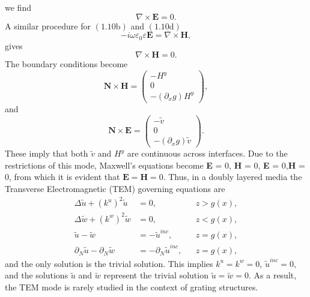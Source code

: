 we find
$$\nabla \times \textbf{E}=0.$$
A similar procedure for $(1.10\text{b})$ and $(1.10\text{d})$
$$-i\omega\varepsilon_0\varepsilon \textbf{E} = \nabla \times \textbf{H},$$
gives
$$\nabla \times \textbf{H}=0.$$
The boundary conditions become
\begin{equation}
\textbf{N} \times \textbf{H} = \begin{pmatrix}
-H^y \\ 0 \\ -(\partial_x g)H^y
\end{pmatrix},
\end{equation}
and
\begin{equation}
\textbf{N} \times \textbf{E} = \begin{pmatrix}
-\tilde{v} \\ 0 \\ -(\partial_x g)\tilde{v}
\end{pmatrix}.
\end{equation}
These imply that both $\tilde{v}$ and $H^y$ are continuous across interfaces. Due to the restrictions of this mode, Maxwell's equations become
\be
\nabla \times \textbf{E} = 0, \quad \nabla \times \textbf{H} = 0, \quad \nabla \cdot \textbf{E} = 0,\quad  \nabla \cdot \textbf{H} = 0,
\ee
from which it is evident that $\textbf{E}=\textbf{H}=0$. Thus, in a doubly layered media the Transverse Electromagnetic (TEM) governing equations are
\begin{subequations}
\begin{align}
\Delta \tilde{u} + (k^u)^2 \tilde{u} &=0,&& z > g(x),\\
\Delta \tilde{w} + (k^w)^2 \tilde{w} &=0,&& z < g(x),\\
\tilde{u}-\tilde{w} &= -\tilde{u}^{inc},&& z=g(x),\\
\partial_N \tilde{u}-\partial_N \tilde{w} &= -\partial_N \tilde{u}^{inc},&& z=g(x),
\end{align}
\end{subequations}
and the only solution is the trivial solution. This implies $k^u=k^w=0$, $\tilde{u}^{inc}=0$, and the solutions $\tilde{u}$ and $\tilde{w}$ represent the trivial solution $\tilde{u}=\tilde{w}=0$. As a result, the TEM mode is rarely studied in the context of grating structures.